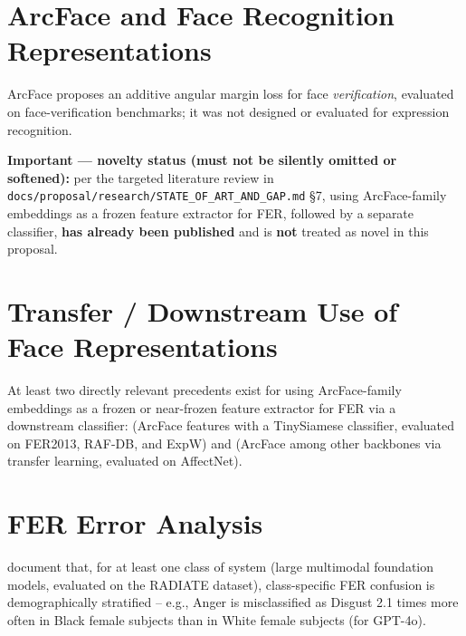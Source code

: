 \section{ArcFace and Face Recognition Representations}
\label{sec:lit-arcface}
ArcFace \citep{deng2019arcface} proposes an additive angular margin loss for face \emph{verification}, evaluated on face-verification benchmarks; it was not designed or evaluated for expression recognition.

\textbf{Important — novelty status (must not be silently omitted or softened):} per the targeted literature review in \texttt{docs/proposal/research/STATE\_OF\_ART\_AND\_GAP.md} \S7, using ArcFace-family embeddings as a frozen feature extractor for FER, followed by a separate classifier, \textbf{has already been published} and is \textbf{not} treated as novel in this proposal.

\section{Transfer / Downstream Use of Face Representations}
\label{sec:lit-transfer}
At least two directly relevant precedents exist for using ArcFace-family embeddings as a frozen or near-frozen feature extractor for FER via a downstream classifier: \citet{altaha2023facial} (ArcFace features with a TinySiamese classifier, evaluated on FER2013, RAF-DB, and ExpW) and \citet{waldner2024pairwise} (ArcFace among other backbones via transfer learning, evaluated on AffectNet).

\section{FER Error Analysis}
\label{sec:lit-error-analysis}
\citet{chhua2024bias} document that, for at least one class of system (large multimodal foundation models, evaluated on the RADIATE dataset), class-specific FER confusion is demographically stratified -- e.g., Anger is misclassified as Disgust 2.1 times more often in Black female subjects than in White female subjects (for GPT-4o).

